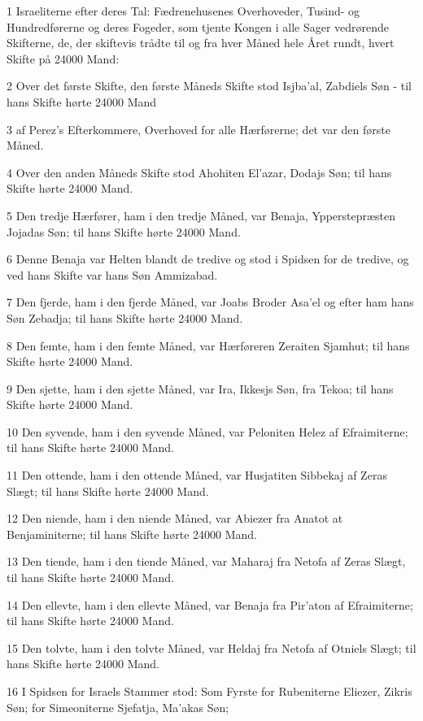 \par 1 Israeliterne efter deres Tal: Fædrenehusenes Overhoveder, Tusind- og Hundredførerne og deres Fogeder, som tjente Kongen i alle Sager vedrørende Skifterne, de, der skiftevis trådte til og fra hver Måned hele Året rundt, hvert Skifte på 24000 Mand:
\par 2 Over det første Skifte, den første Måneds Skifte stod Isjba'al, Zabdiels Søn - til hans Skifte hørte 24000 Mand
\par 3 af Perez's Efterkommere, Overhoved for alle Hærførerne; det var den første Måned.
\par 4 Over den anden Måneds Skifte stod Ahohiten El'azar, Dodajs Søn; til hans Skifte hørte 24000 Mand.
\par 5 Den tredje Hærfører, ham i den tredje Måned, var Benaja, Ypperstepræsten Jojadas Søn; til hans Skifte hørte 24000 Mand.
\par 6 Denne Benaja var Helten blandt de tredive og stod i Spidsen for de tredive, og ved hans Skifte var hans Søn Ammizabad.
\par 7 Den fjerde, ham i den fjerde Måned, var Joabs Broder Asa'el og efter ham hans Søn Zebadja; til hans Skifte hørte 24000 Mand.
\par 8 Den femte, ham i den femte Måned, var Hærføreren Zeraiten Sjamhut; til hans Skifte hørte 24000 Mand.
\par 9 Den sjette, ham i den sjette Måned, var Ira, Ikkesjs Søn, fra Tekoa; til hans Skifte hørte 24000 Mand.
\par 10 Den syvende, ham i den syvende Måned, var Peloniten Helez af Efraimiterne; til hans Skifte hørte 24000 Mand.
\par 11 Den ottende, ham i den ottende Måned, var Husjatiten Sibbekaj af Zeras Slægt; til hans Skifte hørte 24000 Mand.
\par 12 Den niende, ham i den niende Måned, var Abiezer fra Anatot at Benjaminiterne; til hans Skifte hørte 24000 Mand.
\par 13 Den tiende, ham i den tiende Måned, var Maharaj fra Netofa af Zeras Slægt, til hans Skifte hørte 24000 Mand.
\par 14 Den ellevte, ham i den ellevte Måned, var Benaja fra Pir'aton af Efraimiterne; til hans Skifte hørte 24000 Mand.
\par 15 Den tolvte, ham i den tolvte Måned, var Heldaj fra Netofa af Otniels Slægt; til hans Skifte hørte 24000 Mand.
\par 16 I Spidsen for Israels Stammer stod: Som Fyrste for Rubeniterne Eliezer, Zikris Søn; for Simeoniterne Sjefatja, Ma'akas Søn;
